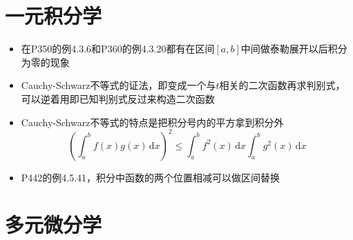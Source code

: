 \documentclass[UTF8]{ctexart}
\newcommand{\ud}{\,\mathrm{d}}
\begin{document}
\section{一元积分学}
\begin{itemize}
\item 在P350的例4.3.6和P360的例4.3.20都有在区间$[a,b]$中间做泰勒展开以后积分为零的现象


\item Cauchy-Schwarz不等式的证法，即变成一个与$t$相关的二次函数再求判别式，可以逆着用即已知判别式反过来构造二次函数

\item Cauchy-Schwarz不等式的特点是把积分号内的平方拿到积分外
\[
\left(\int_a^b f(x)g(x)\ud x \right)^2 \leq \int_a^b f^2(x)\ud x \int_a^b g^2(x)\ud x
\]

\item P442的例4.5.41，积分中函数的两个位置相减可以做区间替换

\end{itemize}

\section{多元微分学}
\end{document}
